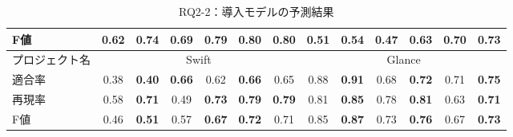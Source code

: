 \documentclass[T,J]{fose} %
\begin{document}
\begin{table}[t]
{\begin{tabular}{l|cc|cc|cc|cc|cc|cc}
F値                    & 0.62       & {\textbf{0.74}}      & 0.69       & {\textbf{0.79}}      & {\textbf{0.80}}       & {\textbf{0.80}}      & 0.51       & {\textbf{0.54}}      & 0.47       & {\textbf{0.63}}      & 0.70       & {\textbf{0.73}}      \\ \hline
プロジェクト名               & \multicolumn{6}{c|}{Swift}                                                & \multicolumn{6}{c}{Glance}                                               \\ \hline
適合率                   & 0.38       & {\textbf{0.40}}      & {\textbf{0.66}}       & 0.62      & {\textbf{0.66}}       & 0.65      & 0.88       & {\textbf{0.91}}      & 0.68       & {\textbf{0.72}}      & 0.71       & {\textbf{0.75}}      \\
再現率                   & 0.58       & {\textbf{0.71}}      & 0.49       & {\textbf{0.73}}      & {\textbf{0.79}}       & {\textbf{0.79}}      & 0.81       & {\textbf{0.85}}      & 0.78       & {\textbf{0.81}}      & 0.63       & {\textbf{0.71}}      \\
F値                    & 0.46       & {\textbf{0.51}}      & 0.57       & {\textbf{0.67}}      & {\textbf{0.72}}       & 0.71      & 0.85       & {\textbf{0.87}}      & 0.73       & {\textbf{0.76}}      & 0.67       & {\textbf{0.73}}     \\ \hline
\end{tabular}
}

\vspace{4mm}

\caption{RQ2-2：導入モデルの予測結果}
\label{table:merge_predict}
\centering
  \scalebox{0.87}{

}
\end{table}
\end{document}
